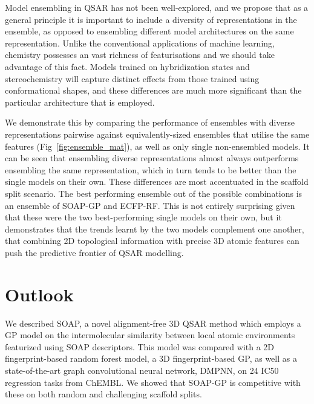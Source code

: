 Model ensembling in QSAR has not been well-explored, and we propose that as a general principle it is important to include a diversity of representations in the ensemble, as opposed to ensembling different model architectures on the same representation. Unlike the conventional applications of machine learning, chemistry possesses an vast richness of featurisations and we should take advantage of this fact. Models trained on hybridization states and stereochemistry will capture distinct effects from those trained using conformational shapes, and these differences are much more significant than the particular architecture that is employed.

We demonstrate this by comparing the performance of ensembles with diverse representations pairwise against equivalently-sized ensembles that utilise the same features (Fig~\ref{fig:ensemble_mat}), as well as only single non-ensembled models. It can be seen that ensembling diverse representations almost always outperforms ensembling the same representation, which in turn tends to be better than the single models on their own. These differences are most accentuated in the scaffold split scenario. The best performing ensemble out of the possible combinations is an ensemble of SOAP-GP and ECFP-RF. This is not entirely surprising given that these were the two best-performing single models on their own, but it demonstrates that the trends learnt by the two models complement one another, that combining 2D topological information with precise 3D atomic features can push the predictive frontier of QSAR modelling.

\section{Outlook}
We described SOAP, a novel alignment-free 3D QSAR method which employs a GP model on the intermolecular similarity between local atomic environments featurized using SOAP descriptors. This model was compared with a 2D fingerprint-based random forest model, a 3D fingerprint-based GP, as well as a state-of-the-art graph convolutional neural network, DMPNN, on 24 IC50 regression tasks from ChEMBL. We showed that SOAP-GP is competitive with these on both random and challenging scaffold splits.


